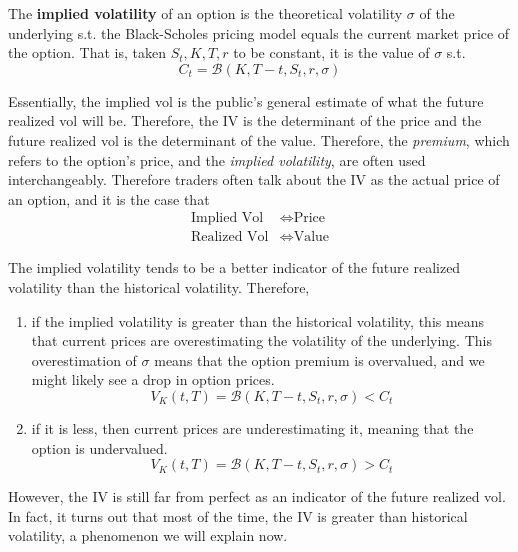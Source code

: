 \documentclass{article}
\begin{document}
    \begin{definition}
      The \textbf{implied volatility} of an option is the theoretical volatility $\sigma$ of the underlying s.t. the Black-Scholes pricing model equals the current market price of the option. That is, taken $S_t, K, T, r$ to be constant, it is the value of $\sigma$ s.t. 
      \begin{equation}
        C_t = \mathcal{B}(K, T - t, S_t, r, \sigma)
      \end{equation}
    \end{definition}

    Essentially, the implied vol is the public's general estimate of what the future realized vol will be. Therefore, the IV is the determinant of the price and the future realized vol is the determinant of the value. Therefore, the \textit{premium}, which refers to the option's price, and the \textit{implied volatility}, are often used interchangeably. Therefore traders often talk about the IV as the actual price of an option, and it is the case that 
    \begin{align*}
      \text{Implied Vol} & \iff  \text{Price} \\ 
      \text{Realized Vol} & \iff \text{Value}
    \end{align*}
  
    The implied volatility tends to be a better indicator of the future realized volatility than the historical volatility. Therefore, 
    \begin{enumerate}
      \item if the implied volatility is greater than the historical volatility, this means that current prices are overestimating the volatility of the underlying. This overestimation of $\sigma$ means that the option premium is overvalued, and we might likely see a drop in option prices. 
      \begin{equation}
        V_K (t, T) = \mathcal{B} (K, T - t, S_t, r, \sigma) < C_t
      \end{equation}

      \item if it is less, then current prices are underestimating it, meaning that the option is undervalued. 
      \begin{equation}
        V_K (t, T) = \mathcal{B} (K, T - t, S_t, r, \sigma) > C_t
      \end{equation}
    \end{enumerate}
    However, the IV is still far from perfect as an indicator of the future realized vol. In fact, it turns out that most of the time, the IV is greater than historical volatility, a phenomenon we will explain now. 
\end{document}

